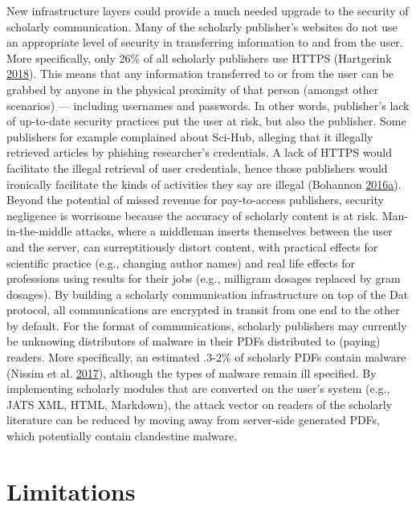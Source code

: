 \documentclass[a5paper]{book}
\begin{document}
New infrastructure layers could provide a much needed upgrade to the
security of scholarly communication. Many of the scholarly publisher's
websites do not use an appropriate level of security in transferring
information to and from the user. More specifically, only 26\% of all
scholarly publishers use HTTPS (Hartgerink
\protect\hyperlink{ref-https-hartgerink}{2018}). This means that any
information transferred to or from the user can be grabbed by anyone in
the physical proximity of that person (amongst other scenarios) ---
including usernames and passwords. In other words, publisher's lack of
up-to-date security practices put the user at risk, but also the
publisher. Some publishers for example complained about Sci-Hub,
alleging that it illegally retrieved articles by phishing researcher's
credentials. A lack of HTTPS would facilitate the illegal retrieval of
user credentials, hence those publishers would ironically facilitate the
kinds of activities they say are illegal (Bohannon
\protect\hyperlink{ref-doi:10.1126ux2fscience.aaf5664}{2016}\protect\hyperlink{ref-doi:10.1126ux2fscience.aaf5664}{a}).
Beyond the potential of missed revenue for pay-to-access publishers,
security negligence is worrisome because the accuracy of scholarly
content is at risk. Man-in-the-middle attacks, where a middleman inserts
themselves between the user and the server, can surreptitiously distort
content, with practical effects for scientific practice (e.g., changing
author names) and real life effects for professions using results for
their jobs (e.g., milligram dosages replaced by gram dosages). By
building a scholarly communication infrastructure on top of the Dat
protocol, all communications are encrypted in transit from one end to
the other by default. For the format of communications, scholarly
publishers may currently be unknowing distributors of malware in their
PDFs distributed to (paying) readers. More specifically, an estimated
.3-2\% of scholarly PDFs contain malware (Nissim et al.
\protect\hyperlink{ref-doi:10.3233ux2f978-1-61499-744-3-107}{2017}),
although the types of malware remain ill specified. By implementing
scholarly modules that are converted on the user's system (e.g., JATS
XML, HTML, Markdown), the attack vector on readers of the scholarly
literature can be reduced by moving away from server-side generated
PDFs, which potentially contain clandestine malware.

\section{Limitations}\label{limitations}
\end{document}
